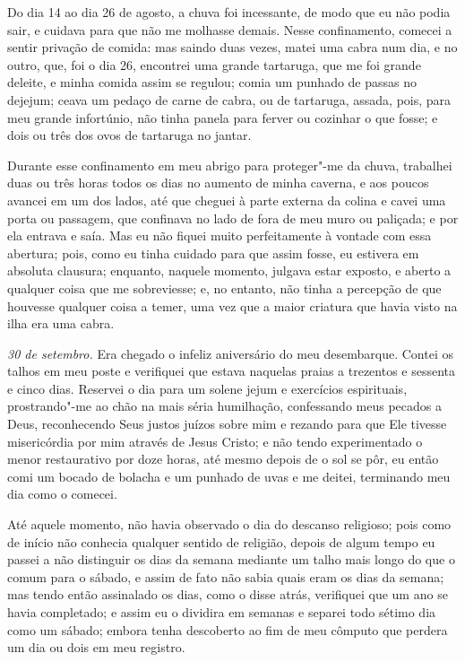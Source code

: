 Do dia 14 ao dia 26 de agosto, a chuva foi incessante, de modo que eu
não podia sair, e cuidava para que não me molhasse demais. Nesse
confinamento, comecei a sentir privação de comida: mas saindo duas
vezes, matei uma cabra num dia, e no outro, que, foi o dia 26, encontrei
uma grande tartaruga, que me foi grande deleite, e minha comida assim se
regulou; comia um punhado de passas no dejejum; ceava um pedaço de carne
de cabra, ou de tartaruga, assada, pois, para meu grande infortúnio, não
tinha panela para ferver ou cozinhar o que fosse; e dois ou três dos
ovos de tartaruga no jantar.

Durante esse confinamento em meu abrigo para proteger"-me da chuva,
trabalhei duas ou três horas todos os dias no aumento de minha caverna,
e aos poucos avancei em um dos lados, até que cheguei à parte externa da
colina e cavei uma porta ou passagem, que confinava no lado de fora de
meu muro ou paliçada; e por ela entrava e saía. Mas eu não fiquei muito
perfeitamente à vontade com essa abertura; pois, como eu tinha cuidado
para que assim fosse, eu estivera em absoluta clausura; enquanto,
naquele momento, julgava estar exposto, e aberto a qualquer coisa que me
sobreviesse; e, no entanto, não tinha a percepção de que houvesse
qualquer coisa a temer, uma vez que a maior criatura que havia visto na
ilha era uma cabra.

\emph{30 de setembro.} Era chegado o infeliz aniversário do meu
desembarque. Contei os talhos em meu poste e verifiquei que estava
naquelas praias a trezentos e sessenta e cinco dias. Reservei o dia para
um solene jejum e exercícios espirituais, prostrando"-me ao chão na mais
séria humilhação, confessando meus pecados a Deus, reconhecendo Seus
justos juízos sobre mim e rezando para que Ele tivesse misericórdia por
mim através de Jesus Cristo; e não tendo experimentado o menor
restaurativo por doze horas, até mesmo depois de o sol se pôr, eu então
comi um bocado de bolacha e um punhado de uvas e me deitei, terminando
meu dia como o comecei.

Até aquele momento, não havia observado o dia do descanso religioso;
pois como de início não conhecia qualquer sentido de religião, depois de
algum tempo eu passei a não distinguir os dias da semana mediante um
talho mais longo do que o comum para o sábado, e assim de fato não sabia
quais eram os dias da semana; mas tendo então assinalado os dias, como o
disse atrás, verifiquei que um ano se havia completado; e assim eu o
dividira em semanas e separei todo sétimo dia como um sábado; embora
tenha descoberto ao fim de meu cômputo que perdera um dia ou dois em meu
registro.

